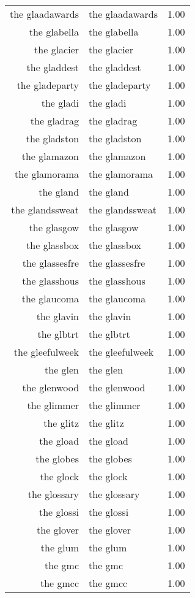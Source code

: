 \begin{table}[ht]
\begin{tabular}{rlr}
  the glaadawards & the glaadawards & 1.00 \\ 
  the glabella & the glabella & 1.00 \\ 
  the glacier & the glacier & 1.00 \\ 
  the gladdest & the gladdest & 1.00 \\ 
  the gladeparty & the gladeparty & 1.00 \\ 
  the gladi & the gladi & 1.00 \\ 
  the gladrag & the gladrag & 1.00 \\ 
  the gladston & the gladston & 1.00 \\ 
  the glamazon & the glamazon & 1.00 \\ 
  the glamorama & the glamorama & 1.00 \\ 
  the gland & the gland & 1.00 \\ 
  the glandssweat & the glandssweat & 1.00 \\ 
  the glasgow & the glasgow & 1.00 \\ 
  the glassbox & the glassbox & 1.00 \\ 
  the glassesfre & the glassesfre & 1.00 \\ 
  the glasshous & the glasshous & 1.00 \\ 
  the glaucoma & the glaucoma & 1.00 \\ 
  the glavin & the glavin & 1.00 \\ 
  the glbtrt & the glbtrt & 1.00 \\ 
  the gleefulweek & the gleefulweek & 1.00 \\ 
  the glen & the glen & 1.00 \\ 
  the glenwood & the glenwood & 1.00 \\ 
  the glimmer & the glimmer & 1.00 \\ 
  the glitz & the glitz & 1.00 \\ 
  the gload & the gload & 1.00 \\ 
  the globes & the globes & 1.00 \\ 
  the glock & the glock & 1.00 \\ 
  the glossary & the glossary & 1.00 \\ 
  the glossi & the glossi & 1.00 \\ 
  the glover & the glover & 1.00 \\ 
  the glum & the glum & 1.00 \\ 
  the gmc & the gmc & 1.00 \\ 
  the gmcc & the gmcc & 1.00 \\ 

\end{tabular}
\end{table}
